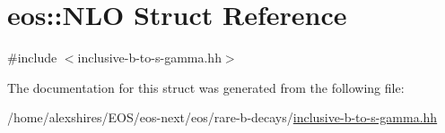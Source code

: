 \hypertarget{structeos_1_1NLO}{
\section{eos::NLO Struct Reference}
\label{structeos_1_1NLO}
}


{\ttfamily \#include $<$inclusive-\/b-\/to-\/s-\/gamma.hh$>$}

The documentation for this struct was generated from the following file:\begin{DoxyCompactItemize}
\item 
/home/alexshires/EOS/eos-\/next/eos/rare-\/b-\/decays/\hyperlink{inclusive-b-to-s-gamma_8hh}{inclusive-\/b-\/to-\/s-\/gamma.hh}\end{DoxyCompactItemize}
